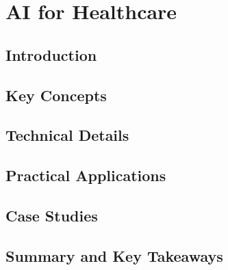 ﻿%

\chapter{AI for Healthcare}
\label{ch:chapter-19}

\section{Introduction}


\section{Key Concepts}


\section{Technical Details}


\section{Practical Applications}


\section{Case Studies}


\section{Summary and Key Takeaways}



